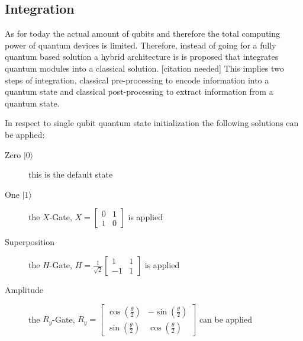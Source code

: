\subsection{Integration}
\label{subsec:integration}
As for today the actual amount of qubits and therefore the total computing power of quantum devices is limited. Therefore, instead of going for a fully quantum based solution a hybrid architecture is is proposed that integrates quantum modules into a classical solution. [citation needed] This implies two steps of integration, classical pre-processing to encode information into a quantum state and classical post-processing to extract information from a quantum state.

In respect to single qubit quantum state initialization the following solutions can be applied:
\begin{description}
  \item [Zero $|0\rangle$] this is the default state
  \item [One $|1\rangle$] the $X$-Gate, $X = \begin{bmatrix}0 & 1 \\ 1 & 0\end{bmatrix}$ is applied
  \item [Superposition] the $H$-Gate, $H = \frac{1}{\sqrt{2}}\begin{bmatrix}1 & 1 \\ -1 & 1\end{bmatrix}$ is applied
  \item [Amplitude] the $R_y$-Gate, $R_y = \begin{bmatrix}\cos(\frac{\theta}{2}) & -\sin(\frac{\theta}{2}) \\ \sin(\frac{\theta}{2}) & \cos(\frac{\theta}{2})\end{bmatrix}$ can be applied
\end{description}

